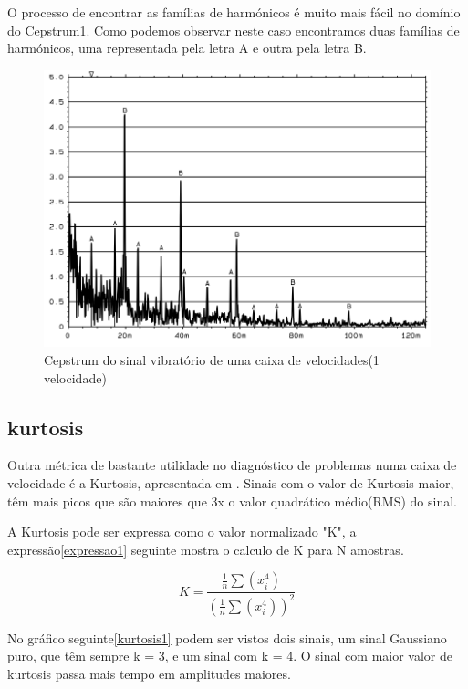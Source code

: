 O processo de encontrar as famílias de harmónicos é muito mais fácil no domínio do Cepstrum\ref{spectrum Cepstrum2}. Como podemos observar neste caso encontramos duas famílias de harmónicos, uma representada pela letra A e outra pela letra B.


\begin{figure}[H]
\centering
\includegraphics[scale=0.3]{figs/spectrum_cepstrum2}
\caption{Cepstrum do sinal vibratório de uma caixa de velocidades(1 velocidade)}\label{spectrum Cepstrum2}
\end{figure}

\subsection{kurtosis}

Outra métrica de bastante utilidade no diagnóstico de problemas numa caixa de velocidade é a Kurtosis, apresentada em \textcite{Kurtosis}. Sinais com o valor de Kurtosis maior, têm mais picos que são maiores que 3x o valor quadrático médio(RMS) do sinal.

A Kurtosis pode ser expressa como o valor normalizado "K", a expressão\ref{expressao1} seguinte mostra o calculo de K para N amostras.


\begin{equation}	
	K = \frac{\frac{1}{n}\sum \left ( x_{i}^{4} \right )}{(\frac{1}{n}\sum (x_{i}^{4}))^{2}}
\label{expressao1}
\end{equation}

No gráfico seguinte\ref{kurtosis1} podem ser vistos dois sinais, um sinal Gaussiano puro, que têm sempre k = 3, e um sinal com k = 4. O sinal com maior valor de kurtosis passa mais tempo em amplitudes maiores.

